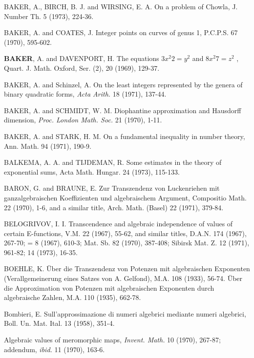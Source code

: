 \begin{hanglist}
    \item BAKER, A., BIRCH, B. J. and WIRSING, E. A. On a problem of Chowla, J. Number Th. 5 (1973), 224-36.
    \item BAKER, A. and COATES, J. Integer points on curves of genus 1, P.C.P.S. 67 (1970), 595-602.
    \item \textbf{BAKER}, A. and DAVENPORT, H. The equations  $3x^2 2 = y^2$  and  $8x^2 7 = z^2$ , Quart. J. Math. Oxford, Ser. (2), 20 (1969), 129-37.
    \item BAKER, A. and Schinzel, A. On the least integers represented by the genera of binary quadratic forms, \textit{Acta Arith.} 18 (1971), 137-44.
    \item BAKER, A. and SCHMIDT, W. M. Diophantine approximation and Hausdorff dimension, \textit{Proc. London Math. Soc.} 21 (1970), 1-11.
    \item BAKER, A. and STARK, H. M. On a fundamental inequality in number theory, Ann. Math. 94 (1971), 190-9.
    \item BALKEMA, A. A. and TIJDEMAN, R. Some estimates in the theory of exponential sums, Acta Math. Hungar. 24 (1973), 115-133.
    \item BARON, G. and BRAUNE, E. Zur Transzendenz von Luckenriehen mit ganzalgebraischen Koeffizienten und algebraischem Argument, Compositio Math. 22 (1970), 1-6, and a similar title, Arch. Math. (Basel) 22 (1971), 379-84.
    \item BELOGRIVOV, I. I. Transcendence and algebraic independence of values of certain E-functions, V.M. 22 (1967), 55-62, and similar titles, D.A.N. 174 (1967), 267-70; = 8 (1967), 610-3; Mat. Sb. 82 (1970), 387-408; Sibirsk Mat. Z. 12 (1971), 961-82; 14 (1973), 16-35.
    \item BOEHLE, K. Über die Transzendenz von Potenzen mit algebraischen Exponenten (Verallgemeinerung eines Satzes von A. Gelfond), M.A. 108 (1933), 56-74. Über die Approximation von Potenzen mit algebraischen Exponenten durch algebraische Zahlen, M.A. 110 (1935), 662-78.
    \item Bombieri, E. Sull'approssimazione di numeri algebrici mediante numeri algebrici, Boll. Un. Mat. Ital. 13 (1958), 351-4.
    \item \hspace{1.5em} Algebraic values of meromorphic maps, \textit{Invent. Math.} 10 (1970), 267-87; addendum, \textit{ibid.} 11 (1970), 163-6.

\end{hanglist}
